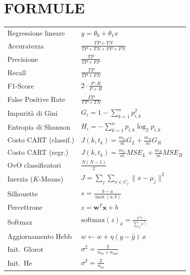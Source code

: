 \documentclass[a4paper,11pt]{report}
\begin{document}
\section{FORMULE}
\begin{center}
\renewcommand{\arraystretch}{1.8}
\begin{tabular}{@{} l l @{}}
Regressione lineare & $y = \theta_0 + \theta_1 x$ \\
Accuratezza & $\displaystyle\frac{TP + TN}{TP + TN + FP + FN}$ \\[4pt]
Precisione & $\displaystyle\frac{TP}{TP + FP}$ \\[4pt]
Recall & $\displaystyle\frac{TP}{TP + FN}$ \\[4pt]
F1-Score & $\displaystyle 2 \cdot \frac{P \cdot R}{P + R}$ \\[4pt]
False Positive Rate & $\displaystyle\frac{FP}{FP + TN}$ \\[4pt]
Impurit\`a di Gini & $\displaystyle G_i = 1 - \sum_{k=1}^{n} p_{i,k}^2$ \\[4pt]
Entropia di Shannon & $\displaystyle H_i = -\sum_{k=1}^{n} p_{i,k} \log_2 p_{i,k}$ \\[4pt]
Costo CART (classif.) & $\displaystyle J(k,t_k) = \frac{m_L}{m} G_L + \frac{m_R}{m} G_R$ \\[4pt]
Costo CART (regr.) & $\displaystyle J(k,t_k) = \frac{m_L}{m} MSE_L + \frac{m_R}{m} MSE_R$ \\[4pt]
OvO classificatori & $\displaystyle\frac{N(N-1)}{2}$ \\
Inerzia ($K$-Means) & $\displaystyle J = \sum_{j} \sum_{x \in C_j} \|x - \mu_j\|^2$ \\[4pt]
Silhouette & $\displaystyle s = \frac{b-a}{\max(a,b)}$ \\[4pt]
Percettrone & $\displaystyle z = \mathbf{w}^T\mathbf{x} + b$ \\[4pt]
Softmax & $\displaystyle \text{softmax}(z)_k = \frac{e^{z_k}}{\sum_j e^{z_j}}$ \\[4pt]
Aggiornamento Hebb & $\displaystyle w \leftarrow w + \eta(y - \hat{y})\,x$ \\[4pt]
Init.\ Glorot & $\displaystyle \sigma^2 = \frac{2}{n_{in}+n_{out}}$ \\[4pt]
Init.\ He & $\displaystyle \sigma^2 = \frac{2}{n_{in}}$ \\[4pt]
\end{tabular}
\end{center}
\end{document}
